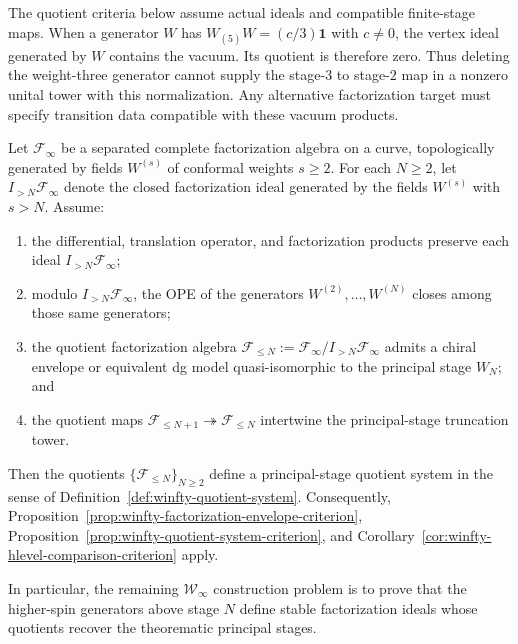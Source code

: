 \begin{remark}
\label{rem:winfty-factorization-route}
The quotient criteria below assume actual ideals and compatible finite-stage maps.
When a generator $W$ has $W_{(5)}W=(c/3)\mathbf1$ with $c\ne0$, the vertex ideal generated by $W$ contains the vacuum.
Its quotient is therefore zero.
Thus deleting the weight-three generator cannot supply the stage-$3$ to stage-$2$ map in a nonzero unital tower with this normalization.
Any alternative factorization target must specify transition data compatible with these vacuum products.
\end{remark}

\begin{proposition}
\label{prop:winfty-higher-spin-ideal-criterion}
Let $\mathcal{F}_\infty$ be a separated complete factorization algebra
on a curve, topologically generated by fields
$W^{(s)}$ of conformal weights $s \ge 2$.  For each $N \ge 2$, let
$I_{>N}\mathcal{F}_\infty$ denote the closed factorization ideal
generated by the fields $W^{(s)}$ with $s > N$.  Assume:
\begin{enumerate}
\item the differential, translation operator, and factorization
  products preserve each ideal $I_{>N}\mathcal{F}_\infty$;
\item modulo $I_{>N}\mathcal{F}_\infty$, the OPE of the generators
  $W^{(2)},\dots,W^{(N)}$ closes among those same generators;
\item the quotient factorization algebra
  $\mathcal{F}_{\le N}:=\mathcal{F}_\infty/I_{>N}\mathcal{F}_\infty$
  admits a chiral envelope or equivalent dg model quasi-isomorphic to
  the principal stage $W_N$; and
\item the quotient maps
  $\mathcal{F}_{\le N+1}\twoheadrightarrow \mathcal{F}_{\le N}$
  intertwine the principal-stage truncation tower.
\end{enumerate}
Then the quotients $\{\mathcal{F}_{\le N}\}_{N \ge 2}$ define a
principal-stage quotient system in the sense of
Definition~\ref{def:winfty-quotient-system}.  Consequently,
Proposition~\ref{prop:winfty-factorization-envelope-criterion},
Proposition~\ref{prop:winfty-quotient-system-criterion}, and
Corollary~\ref{cor:winfty-hlevel-comparison-criterion} apply.

In particular, the remaining $\mathcal{W}_\infty$ construction problem
is to prove that the higher-spin generators above stage $N$ define
stable factorization ideals whose quotients recover the theorematic
principal stages.
\end{proposition}

